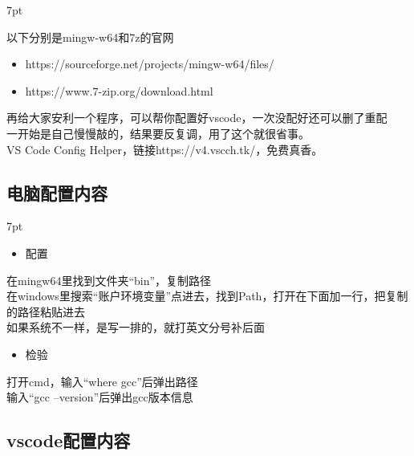 \documentclass{book}
\newenvironment{formal2}{%
\def\FrameCommand{%
\hspace{1pt}%
{\color{Green}\vrule width 2pt}%
{\color{DarkSeaGreen1}\vrule width 4pt}%
\colorbox{greenshade}%
}%
\MakeFramed{\advance\hsize-\width\FrameRestore}%
\noindent\hspace{-4.55pt}%
\begin{adjustwidth}{}{7pt}%
\vspace{2pt}\vspace{2pt}%
}
{%
\vspace{2pt}\end{adjustwidth}\endMakeFramed%
}
\newenvironment{formal4}{%
\def\FrameCommand{%
\hspace{1pt}%
{\color{SkyBlue}\vrule width 2pt}%
{\color{Cyan1}\vrule width 4pt}%
\colorbox{LightCyan1}%
}%
\MakeFramed{\advance\hsize-\width\FrameRestore}%
\noindent\hspace{-4.55pt}%
\begin{adjustwidth}{}{7pt}%
\vspace{2pt}\vspace{2pt}%
}
{%
\vspace{2pt}\end{adjustwidth}\endMakeFramed%
}
\begin{document}
\begin{formal4}
以下分别是mingw-w64和7z的官网\\    
\begin{itemize}
\item https://sourceforge.net/projects/mingw-w64/files/
\item https://www.7-zip.org/download.html\\
\end{itemize}
再给大家安利一个程序，可以帮你配置好vscode，一次没配好还可以删了重配\\
一开始是自己慢慢敲的，结果要反复调，用了这个就很省事。\\
VS Code Config Helper，链接https://v4.vscch.tk/，免费真香。
\end{formal4}

\color{darkgray}
 \begin{shaded}
 {\subsection[short]{电脑配置内容}}
\end{shaded}
\color{black}

\begin{formal2}
\begin{itemize}
\item 配置
\end{itemize}
在mingw64里找到文件夹“bin”，复制路径\\
在windows里搜索“账户环境变量”点进去，找到Path，打开在下面加一行，把复制的路径粘贴进去\\
如果系统不一样，是写一排的，就打英文分号补后面\\
\begin{itemize}
\item 检验
\end{itemize}
打开cmd，输入“where gcc”后弹出路径\\
输入“gcc --version”后弹出gcc版本信息
\end{formal2}

\color{darkgray}
 \begin{shaded}
 {\subsection[short]{vscode配置内容}}
\end{shaded}
\color{black}

\end{document}
